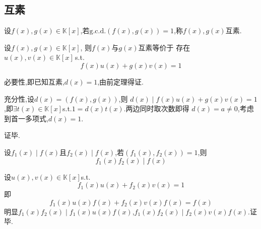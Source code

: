 \subsection{互素}
\begin{formal}
\begin{definition}[互素的定义]\label{def:互素的定义}
    设$f\left(x\right),g\left(x\right)\in\mathbb{K}\left[x\right]$,若$\mathrm{g.c.d.}\left(f\left(x\right),g\left(x\right)\right)=1$,称$f\left(x\right),g\left(x\right)$互素.
\end{definition}
\end{formal}
\begin{formal}
\begin{theorem}[互素判定]\label{thm:互素判定}
    设$f\left(x\right),g\left(x\right)\in\mathbb{K}\left[x\right]$,
    则$f\left(x\right)$与$g\left(x\right)$互素等价于
    存在$u\left(x\right),v\left(x\right)\in\mathbb{K}\left[x\right]$\,\textup{s.t.}
    \[
    f\left(x\right)u\left(x\right)+g\left(x\right)v\left(x\right)=1
    \]
\end{theorem}
\begin{Proof}
必要性,即已知互素,$d\left(x\right)=1$,由前定理得证.

充分性,设$d\left(x\right)=\left(f\left(x\right),g\left(x\right)\right)$,则
$d\left(x\right)\mid f\left(x\right)u\left(x\right)+g\left(x\right)v\left(x\right)=1$,即$\exists
t\left(x\right)\in\mathbb{K}\left[x\right]$\textup{s.t.}$1=d\left(x\right)t\left(x\right)$.两边同时取次数即得
$d\left(x\right)=a\neq 0$,考虑到首一多项式,$d\left(x\right)=1$.

证毕.
\end{Proof}
\end{formal}
\begin{green}
\begin{corollary}[素因子]\label{cor:素因子}
    设$f_1\left(x\right)\mid f\left(x\right)$且$f_2\left(x\right)\mid f\left(x\right)$,若$\left(f_1\left(x\right),f_2\left(x\right)\right)=1$,则\[
    f_1\left(x\right)f_2\left(x\right)\mid f\left(x\right)
    \]
\end{corollary}
\begin{Proof}
设$u\left(x\right),v\left(x\right)\in\mathbb{K}\left[x\right]$\textup{s.t.}
\[
f_1\left(x\right)u\left(x\right)+f_2\left(x\right)v\left(x\right)=1
\]
即\[
f_1\left(x\right)u\left(x\right)f\left(x\right)+f_2\left(x\right)v\left(x\right)f\left(x\right)=f\left(x\right)
\]
明显$f_1\left(x\right)f_2\left(x\right)\mid f_1\left(x\right)u\left(x\right)f\left(x\right)$,$f_1\left(x\right)f_2\left(x\right)\mid
f_2\left(x\right)v\left(x\right)f\left(x\right)$.证毕.
\end{Proof}
\end{green}
